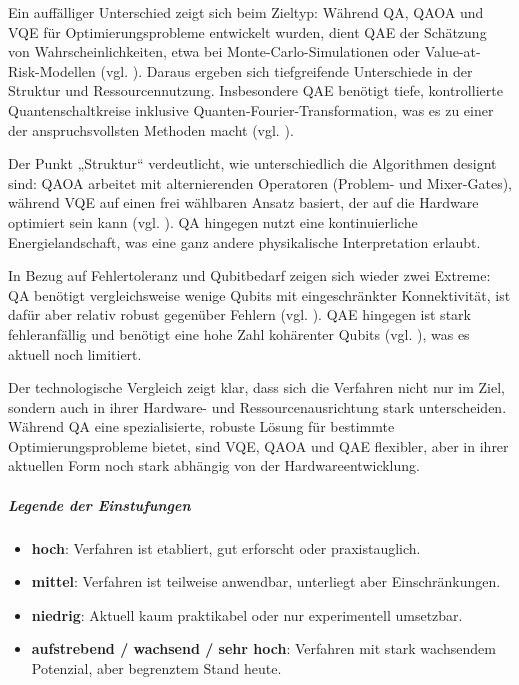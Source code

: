 Ein auffälliger Unterschied zeigt sich beim Zieltyp: Während QA, QAOA und VQE für Optimierungsprobleme entwickelt wurden, dient QAE der Schätzung von Wahrscheinlichkeiten, etwa bei Monte-Carlo-Simulationen oder Value-at-Risk-Modellen (vgl. \cite{rebentrost_quantum_2018, quantumjournal2020}). Daraus ergeben sich tiefgreifende Unterschiede in der Struktur und Ressourcennutzung. Insbesondere QAE benötigt tiefe, kontrollierte Quantenschaltkreise inklusive Quanten-Fourier-Transformation, was es zu einer der anspruchsvollsten Methoden macht (vgl. \cite{martin2022}).

Der Punkt „Struktur“ verdeutlicht, wie unterschiedlich die Algorithmen designt sind: QAOA arbeitet mit alternierenden Operatoren (Problem- und Mixer-Gates), während VQE auf einen frei wählbaren Ansatz basiert, der auf die Hardware optimiert sein kann (vgl. \cite{brandhofer_benchmarking_2022}). QA hingegen nutzt eine kontinuierliche Energielandschaft, was eine ganz andere physikalische Interpretation erlaubt.

In Bezug auf Fehlertoleranz und Qubitbedarf zeigen sich wieder zwei Extreme: QA benötigt vergleichsweise wenige Qubits mit eingeschränkter Konnektivität, ist dafür aber relativ robust gegenüber Fehlern (vgl. \cite{sakuler_real-world_2025}). QAE hingegen ist stark fehleranfällig und benötigt eine hohe Zahl kohärenter Qubits (vgl. \cite{bouland_prospects_2020}), was es aktuell noch limitiert.

Der technologische Vergleich zeigt klar, dass sich die Verfahren nicht nur im Ziel, sondern auch in ihrer Hardware- und Ressourcenausrichtung stark unterscheiden. Während QA eine spezialisierte, robuste Lösung für bestimmte Optimierungsprobleme bietet, sind VQE, QAOA und QAE flexibler, aber in ihrer aktuellen Form noch stark abhängig von der Hardwareentwicklung.

\subparagraph{Legende der Einstufungen}

\begin{itemize}
    \item \textbf{hoch}: Verfahren ist etabliert, gut erforscht oder praxistauglich.
    \item \textbf{mittel}: Verfahren ist teilweise anwendbar, unterliegt aber Einschränkungen.
    \item \textbf{niedrig}: Aktuell kaum praktikabel oder nur experimentell umsetzbar.
    \item \textbf{aufstrebend / wachsend / sehr hoch}: Verfahren mit stark wachsendem Potenzial, aber begrenztem Stand heute.
\end{itemize}

